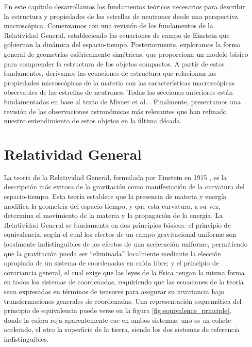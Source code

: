 En este capítulo desarrollamos los fundamentos teóricos necesarios para describir la estructura y propiedades de las estrellas de neutrones desde una perspectiva macroscópica. Comenzamos con una revisión de los fundamentos de la Relatividad General, estableciendo las ecuaciones de campo de Einstein que gobiernan la dinámica del espacio-tiempo. Posteriormente, exploramos la forma general de geometrías esféricamente simétricas, que proporciona un modelo básico para comprender la estructura de los objetos compactos. A partir de estos fundamentos, derivamos las ecuaciones de estructura que relacionan las propiedades microscópicas de la materia con las características macroscópicas observables de las estrellas de neutrones. Todas las secciones anteriores están fundamentadas en base al texto de Misner et al. \cite{misnerGravitation2017}. Finalmente, presentamos una revisión de las observaciones astronómicas más relevantes que han refinado nuestro entendimiento de estos objetos en la última década.

\section{Relatividad General}

La teoría de la Relatividad General, formulada por Einstein en 1915 \cite{einsteinFeldgleichungenGravitation1915}, es la descripción más exitosa de la gravitación como manifestación de la curvatura del espacio-tiempo. Esta teoría establece que la presencia de materia y energía modifica la geometría del espacio-tiempo, y que esta curvatura, a su vez, determina el movimiento de la materia y la propagación de la energía. La Relatividad General se fundamenta en dos principios básicos: el principio de equivalencia, según el cual los efectos de un campo gravitacional uniforme son localmente indistinguibles de los efectos de una aceleración uniforme, permitiendo que la gravitación pueda ser ``eliminada'' localmente mediante la elección apropiada de un sistema de coordenadas en caída libre; y el principio de covariancia general, el cual exige que las leyes de la física tengan la misma forma en todos los sistemas de coordenadas, requiriendo que las ecuaciones de la teoría sean expresadas en términos de tensores para asegurar su invariancia bajo transformaciones generales de coordenadas. Una representación esquemática del principio de equivalencia puede verse en la figura \ref{fig:equivalence_principle}, donde la esfera roja aparentemente cae en ambos sistemas, uno es un cohete acelerado, el otro la superficie de la tierra, siendo los dos sistemas de referencia indistinguibles.


